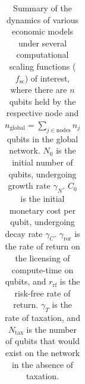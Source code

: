 \begin{table}[!htb]
\begin{tabular}{|m{0.21\linewidth}|m{0.22\linewidth}|m{0.155\linewidth}|m{0.155\linewidth}|m{0.2\linewidth}|}
	\hline
\end{tabular}
\caption{Summary of the dynamics of various economic models under several computational scaling functions ($f_\text{sc}$) of interest, where there are $n$ qubits held by the respective node and \mbox{$n_\text{global}=\sum_{j\in \text{nodes}} n_j$} qubits in the global network. $N_0$ is the initial number of qubits, undergoing growth rate $\gamma_N$. $C_0$ is the initial monetary cost per qubit, undergoing decay rate $\gamma_C$. $\gamma_\text{ror}$ is the rate of return on the licensing of compute-time on qubits, and $r_\text{rf}$ is the risk-free rate of return. $\gamma_T$ is the rate of taxation, and $N_\text{tax}$ is the number of qubits that would exist on the network in the absence of taxation.} \label{tab:summary_ec_models}
\end{table}

\renewcommand{\arraystretch}{1}
\renewcommand{\tablename}{ALG.}

\clearpage